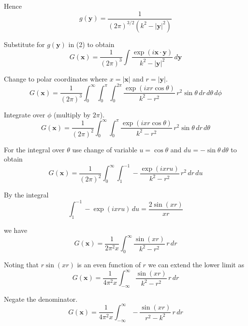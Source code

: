 Hence
\begin{equation*}
g(\mathbf y)=\frac{1}{(2\pi)^{3/2}\left(k^2-|\mathbf y|^2\right)}
\end{equation*}

Substitute for $g(\mathbf y)$ in (2) to obtain
\begin{equation*}
G(\mathbf x)=\frac{1}{(2\pi)^3}\int\frac{\exp(i\mathbf x\cdot\mathbf y)}{k^2-|\mathbf y|^2}\,d\mathbf y
\end{equation*}

Change to polar coordinates where $x=|\mathbf x|$ and $r=|\mathbf y|$.
\begin{equation*}
G(\mathbf x)=\frac{1}{(2\pi)^3}
\int_0^\infty\int_0^\pi\int_0^{2\pi}
\frac{\exp(ixr\cos\theta)}{k^2-r^2}\,r^2\sin\theta\,dr\,d\theta\,d\phi
\end{equation*}

Integrate over $\phi$ (multiply by $2\pi$).
\begin{equation*}
G(\mathbf x)=\frac{1}{(2\pi)^2}
\int_0^\infty\int_0^\pi
\frac{\exp(ixr\cos\theta)}{k^2-r^2}\,r^2\sin\theta\,dr\,d\theta
\end{equation*}

For the integral over $\theta$ use change of variable
$u=\cos\theta$ and $du=-\sin\theta\,d\theta$ to obtain
\begin{equation*}
G(\mathbf x)=\frac{1}{(2\pi)^2}
\int_0^\infty\int_1^{-1}
-\frac{\exp(ixru)}{k^2-r^2}\,r^2\,dr\,du
\end{equation*}

By the integral
\begin{equation*}
\int_1^{-1}-\exp(ixru)\,du=\frac{2\sin(xr)}{xr}
\tag{3}
\end{equation*}

we have
\begin{equation*}
G(\mathbf x)=\frac{1}{2\pi^2x}
\int_0^\infty\frac{\sin(xr)}{k^2-r^2}\,r\,dr
\end{equation*}

Noting that $r\sin(xr)$ is an even function of $r$ we can extend the lower limit as
\begin{equation*}
G(\mathbf x)=\frac{1}{4\pi^2x}
\int_{-\infty}^\infty\frac{\sin(xr)}{k^2-r^2}\,r\,dr
\end{equation*}

Negate the denominator.
\begin{equation*}
G(\mathbf x)=\frac{1}{4\pi^2x}
\int_{-\infty}^\infty-\frac{\sin(xr)}{r^2-k^2}\,r\,dr
\end{equation*}

